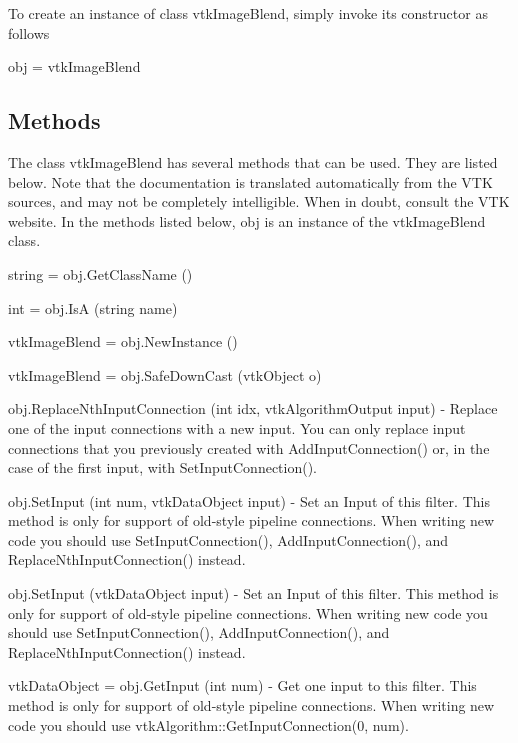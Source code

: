 To create an instance of class vtk\-Image\-Blend, simply invoke its constructor as follows \begin{DoxyVerb}  obj = vtkImageBlend
\end{DoxyVerb}
 \hypertarget{vtkwidgets_vtkxyplotwidget_Methods}{}\subsection{Methods}\label{vtkwidgets_vtkxyplotwidget_Methods}
The class vtk\-Image\-Blend has several methods that can be used. They are listed below. Note that the documentation is translated automatically from the V\-T\-K sources, and may not be completely intelligible. When in doubt, consult the V\-T\-K website. In the methods listed below, {\ttfamily obj} is an instance of the vtk\-Image\-Blend class. 
\begin{DoxyItemize}
\item {\ttfamily string = obj.\-Get\-Class\-Name ()}  
\item {\ttfamily int = obj.\-Is\-A (string name)}  
\item {\ttfamily vtk\-Image\-Blend = obj.\-New\-Instance ()}  
\item {\ttfamily vtk\-Image\-Blend = obj.\-Safe\-Down\-Cast (vtk\-Object o)}  
\item {\ttfamily obj.\-Replace\-Nth\-Input\-Connection (int idx, vtk\-Algorithm\-Output input)} -\/ Replace one of the input connections with a new input. You can only replace input connections that you previously created with Add\-Input\-Connection() or, in the case of the first input, with Set\-Input\-Connection().  
\item {\ttfamily obj.\-Set\-Input (int num, vtk\-Data\-Object input)} -\/ Set an Input of this filter. This method is only for support of old-\/style pipeline connections. When writing new code you should use Set\-Input\-Connection(), Add\-Input\-Connection(), and Replace\-Nth\-Input\-Connection() instead.  
\item {\ttfamily obj.\-Set\-Input (vtk\-Data\-Object input)} -\/ Set an Input of this filter. This method is only for support of old-\/style pipeline connections. When writing new code you should use Set\-Input\-Connection(), Add\-Input\-Connection(), and Replace\-Nth\-Input\-Connection() instead.  
\item {\ttfamily vtk\-Data\-Object = obj.\-Get\-Input (int num)} -\/ Get one input to this filter. This method is only for support of old-\/style pipeline connections. When writing new code you should use vtk\-Algorithm\-::\-Get\-Input\-Connection(0, num).  

\end{DoxyItemize}
